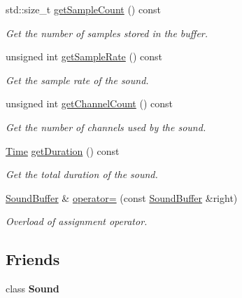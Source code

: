 \begin{DoxyCompactItemize}
std\-::size\-\_\-t \hyperlink{classsf_1_1SoundBuffer_a2df1f1ae89213adee1494b95bb583f9d}{get\-Sample\-Count} () const 
\begin{DoxyCompactList}\small\item\em Get the number of samples stored in the buffer. \end{DoxyCompactList}\item 
unsigned int \hyperlink{classsf_1_1SoundBuffer_a8cdfaea2ad1d05f81fa67442566c166e}{get\-Sample\-Rate} () const 
\begin{DoxyCompactList}\small\item\em Get the sample rate of the sound. \end{DoxyCompactList}\item 
unsigned int \hyperlink{classsf_1_1SoundBuffer_a0a2890747db3811fb8d969d3e3abd0d1}{get\-Channel\-Count} () const 
\begin{DoxyCompactList}\small\item\em Get the number of channels used by the sound. \end{DoxyCompactList}\item 
\hyperlink{classsf_1_1Time}{Time} \hyperlink{classsf_1_1SoundBuffer_aee681c7a0f3dff4c4d0c9f8bbdb51bb0}{get\-Duration} () const 
\begin{DoxyCompactList}\small\item\em Get the total duration of the sound. \end{DoxyCompactList}\item 
\hyperlink{classsf_1_1SoundBuffer}{Sound\-Buffer} \& \hyperlink{classsf_1_1SoundBuffer_adcc786b60bbd95be1551368fafd274a7}{operator=} (const \hyperlink{classsf_1_1SoundBuffer}{Sound\-Buffer} \&right)
\begin{DoxyCompactList}\small\item\em Overload of assignment operator. \end{DoxyCompactList}\end{DoxyCompactItemize}
\subsection*{Friends}
\begin{DoxyCompactItemize}
\item 
\hypertarget{classsf_1_1SoundBuffer_a50914f77c7cf4fb97616c898c5291f4b}{class {\bfseries Sound}}\label{classsf_1_1SoundBuffer_a50914f77c7cf4fb97616c898c5291f4b}

\end{DoxyCompactItemize}


